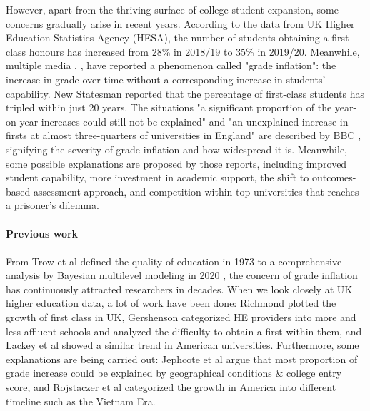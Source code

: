 \documentclass[11pt,a4paper]{article}
\begin{document}
However, apart from the thriving surface of college student expansion, some concerns gradually arise in recent years. According to the data \cite{HESA} from UK Higher Education Statistics Agency (HESA), the number of students obtaining a first-class honours has increased from 28\% in 2018/19 to 35\% in 2019/20. Meanwhile, multiple media \cite{news1}, \cite{news2},\cite{news3} have reported a phenomenon called "grade inflation": the increase in grade over time without a corresponding increase in students' capability. New Statesman \cite{news1} reported that the percentage of first-class students has tripled within just 20 years. The situations "a significant proportion of the year-on-year increases could still not be explained" and "an unexplained increase in firsts at almost three-quarters of universities in England" are described by BBC \cite{news2}, signifying the severity of grade inflation and how widespread it is. Meanwhile, some possible explanations are proposed by those reports, including improved student capability, more investment in academic support, the shift to outcomes-based assessment approach, and competition within top universities that reaches a prisoner's dilemma. 

\paragraph{Previous work}
\paragraph{}

From Trow et al \cite{Trow1973} defined the quality of education in 1973 to a comprehensive analysis by Bayesian multilevel modeling in 2020 \cite{BayMain}, the concern of grade inflation has continuously attracted researchers in decades. When we look closely at UK higher education data, a lot of work have been done: Richmond \cite{FancyPink} plotted the growth of first class in UK, Gershenson \cite{FancyGreen} categorized HE providers into more and less affluent schools and analyzed the difficulty to obtain a first within them, and Lackey et al \cite{USTrend} showed a similar trend in American universities. Furthermore, some explanations are being carried out: Jephcote et al \cite{BayMain} argue that most proportion of grade increase could be explained by geographical conditions \& college entry score, and Rojstaczer et al \cite{GI} categorized the growth in America into different timeline such as the Vietnam Era. 
\end{document}
